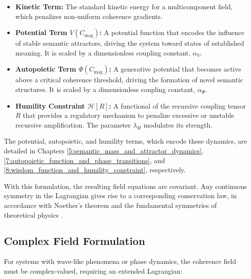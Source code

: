 \begin{itemize}

    \item \textbf{Kinetic Term:} The standard kinetic energy for a multicomponent field, which penalizes non-uniform coherence gradients.

    \item \textbf{Potential Term \(V(C_{\text{mag}})\):} A potential function that encodes the influence of stable semantic attractors, driving the system toward states of established meaning. It is scaled by a dimensionless coupling constant, \(\alpha_V\).

    \item \textbf{Autopoietic Term \(\Phi(C_{\text{mag}})\):} A generative potential that becomes active above a critical coherence threshold, driving the formation of novel semantic structures. It is scaled by a dimensionless coupling constant, \(\alpha_\Phi\).

    \item \textbf{Humility Constraint \(\mathcal{H}[R]\):} A functional of the recursive coupling tensor \(R\) that provides a regulatory mechanism to penalize excessive or unstable recursive amplification. The parameter \(\lambda_H\) modulates its strength.

\end{itemize}

The potential, autopoietic, and humility terms, which encode these dynamics, are detailed in Chapters \ref{5:semantic_mass_and_attractor_dynamics}, \ref{7:autopoietic_function_and_phase_transitions}, and \ref{8:wisdom_function_and_humility_constraint}, respectively.

With this formulation, the resulting field equations are covariant. Any continuous symmetry in the Lagrangian gives rise to a corresponding conservation law, in accordance with Noether's theorem and the fundamental symmetries of theoretical physics \autocite{Noether1918, Lagrange1788, Euler1744, LandauLifshitz1975, PeskinSchroeder1995, Weinberg1995}.


\subsection{Complex Field Formulation}
\label{6.2.1:complex_field_formulation}

For systems with wave-like phenomena or phase dynamics, the coherence field must be complex-valued, requiring an extended Lagrangian:

